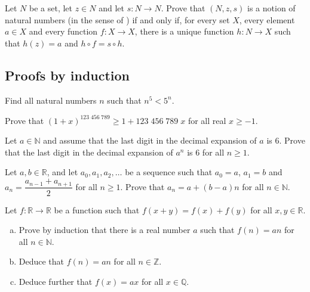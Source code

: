 \begin{chapex}
Let $N$ be a set, let $z \in N$ and let $s : N \to N$. Prove that $(N, z, s)$ is a notion of natural numbers (in the sense of ) if and only if, for every set $X$, every element $a \in X$ and every function $f : X \to X$, there is a unique function $h : N \to X$ such that $h(z)=a$ and $h \circ f = s \circ h$.
\end{chapex}

\subsection*{Proofs by induction}

\begin{chapex}
\label{cqNPowerFiveLessThanFivePowerN}
Find all natural numbers $n$ such that $n^5 < 5^n$.
\end{chapex}

\begin{chapex}
Prove that $(1+x)^{123\;456\;789} \ge 1 + 123\;456\;789\;x$ for all real $x \ge -1$.
\end{chapex}

\begin{chapex}
Let $a \in \mathbb{N}$ and assume that the last digit in the decimal expansion of $a$ is $6$. Prove that the last digit in the decimal expansion of $a^n$ is $6$ for all $n \ge 1$.
\end{chapex}

\begin{chapex}
Let $a,b \in \mathbb{R}$, and let $a_0, a_1, a_2, \dots$ be a sequence such that $a_0 = a$, $a_1=b$ and $a_n = \dfrac{a_{n-1} + a_{n+1}}{2}$ for all $n \ge 1$. Prove that $a_n = a + (b-a) n$ for all $n \in \mathbb{N}$.
\end{chapex}

\begin{chapex}
Let $f : \mathbb{R} \to \mathbb{R}$ be a function such that $f(x+y) = f(x) + f(y)$ for all $x,y \in \mathbb{R}$.
\begin{enumerate}[(a)]
\item Prove by induction that there is a real number $a$ such that $f(n) = an$ for all $n \in \mathbb{N}$.
\item Deduce that $f(n) = an$ for all $n \in \mathbb{Z}$.
\item Deduce further that $f(x) = ax$ for all $x \in \mathbb{Q}$.
\end{enumerate}
\end{chapex}

